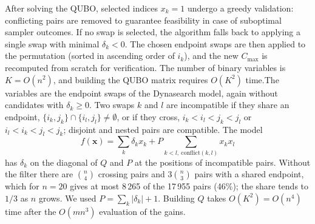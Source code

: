 \documentclass[12pt]{article}
\begin{document}
{After solving the QUBO, selected indices $x_k = 1$ undergo a greedy validation: conflicting pairs are removed to guarantee feasibility in case of suboptimal sampler outcomes. If no swap is selected, the algorithm falls back to applying a single swap with minimal $\delta_k < 0$. The chosen endpoint swaps are then applied to the permutation (sorted in ascending order of $i_k$), and the new $C_{\max}$ is recomputed from scratch for verification. The number of binary variables is $K = O(n^2)$, and building the QUBO matrix requires $O(K^2)$ time.}{The variables are the endpoint swaps of the Dynasearch model, again without candidates with $\delta_k\ge 0$. Two swaps $k$ and $l$ are incompatible if they share an endpoint, $\{i_k,j_k\}\cap\{i_l,j_l\}\ne\emptyset$, or if they cross, $i_k<i_l<j_k<j_l$ or $i_l<i_k<j_l<j_k$; disjoint and nested pairs are compatible. The model
\begin{equation}
f(\mathbf{x})=\sum_k\delta_kx_k+P\sum_{k<l,\ \mathrm{conflict}(k,l)}x_kx_l
\end{equation}
has $\delta_k$ on the diagonal of $Q$ and $P$ at the positions of incompatible pairs. Without the filter there are $\binom{n}{4}$ crossing pairs and $3\binom{n}{3}$ pairs with a shared endpoint, which for $n=20$ gives at most 8\,265 of the 17\,955 pairs (46\%); the share tends to $1/3$ as $n$ grows. We used $P=\sum_k|\delta_k|+1$. Building $Q$ takes $O(K^2)=O(n^4)$ time after the $O(mn^3)$ evaluation of the gains.}
\end{document}
